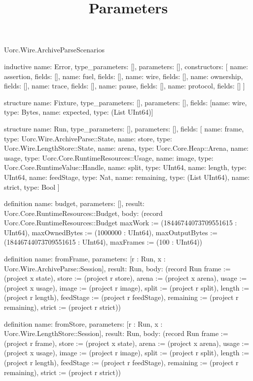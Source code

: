 \begin{lexlean}{Uorc.Wire.ArchiveParseScenarios}
\title{Parameters}
\begin{semanticmodule}
inductive{
  name: Error,
  type_parameters: [],
  parameters: [],
  constructors: [
    {name: assertion, fields: []},
    {name: fuel, fields: []},
    {name: wire, fields: []},
    {name: ownership, fields: []},
    {name: trace, fields: []},
    {name: pause, fields: []},
    {name: protocol, fields: []}
  ]
}

structure{
  name: Fixture,
  type_parameters: [],
  parameters: [],
  fields: [{name: wire, type: Bytes}, {name: expected, type: (List UInt64)}]
}

structure{
  name: Run,
  type_parameters: [],
  parameters: [],
  fields: [
    {name: frame, type: Uorc.Wire.ArchiveParse::State},
    {name: store, type: Uorc.Wire.LengthStore::State},
    {name: arena, type: Uorc.Core.Heap::Arena},
    {name: usage, type: Uorc.Core.RuntimeResources::Usage},
    {name: image, type: Uorc.Core.RuntimeValue::Handle},
    {name: split, type: UInt64},
    {name: length, type: UInt64},
    {name: feedStage, type: Nat},
    {name: remaining, type: (List UInt64)},
    {name: strict, type: Bool}
  ]
}

definition{
  name: budget,
  parameters: [],
  result: Uorc.Core.RuntimeResources::Budget,
  body: (record Uorc.Core.RuntimeResources::Budget {maxWork := (18446744073709551615 : UInt64), maxOwnedBytes := (1000000 : UInt64), maxOutputBytes := (18446744073709551615 : UInt64), maxFrames := (100 : UInt64)})
}

definition{
  name: fromFrame,
  parameters: [r : Run, x : Uorc.Wire.ArchiveParse::Session],
  result: Run,
  body: (record Run {frame := (project x state), store := (project r store), arena := (project x arena), usage := (project x usage), image := (project r image), split := (project r split), length := (project r length), feedStage := (project r feedStage), remaining := (project r remaining), strict := (project r strict)})
}

definition{
  name: fromStore,
  parameters: [r : Run, x : Uorc.Wire.LengthStore::Session],
  result: Run,
  body: (record Run {frame := (project r frame), store := (project x state), arena := (project x arena), usage := (project x usage), image := (project r image), split := (project r split), length := (project r length), feedStage := (project r feedStage), remaining := (project r remaining), strict := (project r strict)})
}


\end{semanticmodule}
\end{lexlean}
